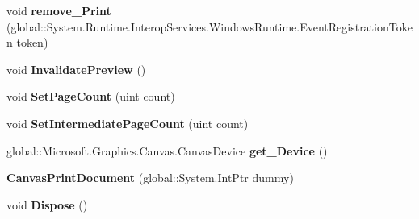 \begin{DoxyCompactItemize}
\item 
\mbox{\label{class_microsoft_1_1_graphics_1_1_canvas_1_1_printing_1_1_canvas_print_document_a247a72beac098c3ac4e60deec5108fb3}} 
void {\bfseries remove\+\_\+\+Print} (global\+::\+System.\+Runtime.\+Interop\+Services.\+Windows\+Runtime.\+Event\+Registration\+Token token)
\item 
\mbox{\label{class_microsoft_1_1_graphics_1_1_canvas_1_1_printing_1_1_canvas_print_document_a8bbb671d9de2e348757da7e7d7c1935c}} 
void {\bfseries Invalidate\+Preview} ()
\item 
\mbox{\label{class_microsoft_1_1_graphics_1_1_canvas_1_1_printing_1_1_canvas_print_document_af703c668de7e2905cf76a064da8dbd29}} 
void {\bfseries Set\+Page\+Count} (uint count)
\item 
\mbox{\label{class_microsoft_1_1_graphics_1_1_canvas_1_1_printing_1_1_canvas_print_document_a570bac56fc10f4180d8e4371d1c2b1ec}} 
void {\bfseries Set\+Intermediate\+Page\+Count} (uint count)
\item 
\mbox{\label{class_microsoft_1_1_graphics_1_1_canvas_1_1_printing_1_1_canvas_print_document_ac10aedd8e487c76596dbcc4eb0804aa4}} 
global\+::\+Microsoft.\+Graphics.\+Canvas.\+Canvas\+Device {\bfseries get\+\_\+\+Device} ()
\item 
\mbox{\label{class_microsoft_1_1_graphics_1_1_canvas_1_1_printing_1_1_canvas_print_document_a7b04c2627b88d8910b67203e8ee65b63}} 
{\bfseries Canvas\+Print\+Document} (global\+::\+System.\+Int\+Ptr dummy)
\item 
\mbox{\label{class_microsoft_1_1_graphics_1_1_canvas_1_1_printing_1_1_canvas_print_document_af8d1422f1d9da5b6eb9b656d9bb4144a}} 
void {\bfseries Dispose} ()
\item 

\end{DoxyCompactItemize}
